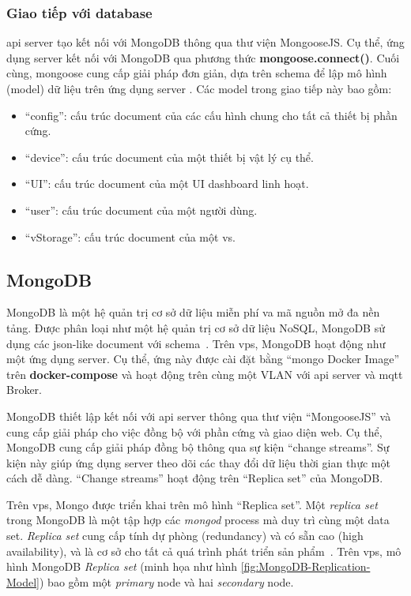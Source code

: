 \subsubsection{Giao tiếp với database}

\acrshort{api} server tạo kết nối với MongoDB thông qua thư viện MongooseJS. Cụ thể, ứng dụng server kết nối với MongoDB qua phương thức \textbf{mongoose.connect()}. Cuối cùng, mongoose cung cấp giải pháp đơn giản, dựa trên schema để lập mô hình (model) dữ liệu trên ứng dụng server \cite{Mongoose-Solution}. Các model trong giao tiếp này bao gồm:

\begin{itemize}
    \item ``config'': cấu trúc document của các cấu hình chung cho tất cả thiết bị phần cứng.
    \item ``device'': cấu trúc document của một thiết bị vật lý cụ thể.
    \item ``UI'': cấu trúc document của một UI dashboard linh hoạt.
    \item ``user'': cấu trúc document của một người dùng.
    \item ``vStorage'': cấu trúc document của một \acrshort{vs}.
\end{itemize}

\subsection{MongoDB}

MongoDB là một hệ quản trị cơ sở dữ liệu miễn phí va mã nguồn mở đa nền tảng. Được phân loại như một hệ quản trị cơ sở dữ liệu NoSQL, MongoDB sử dụng các \acrshort{json}-like document với schema~\cite{MongoDB-Def}. Trên \acrshort{vps}, MongoDB hoạt động như một ứng dụng server. Cụ thể, ứng này được cài đặt bằng ``mongo Docker Image'' trên \textbf{docker-compose} và hoạt động trên cùng một VLAN với \acrshort{api} server và \acrshort{mqtt} Broker.

MongoDB thiết lập kết nối với \acrshort{api} server thông qua thư viện ``MongooseJS'' và cung cấp giải pháp cho việc đồng bộ với phần cứng và giao diện web. Cụ thể, MongoDB cung cấp giải pháp đồng bộ thông qua sự kiện ``change streams''. Sự kiện này giúp ứng dụng server theo dõi các thay đổi dữ liệu thời gian thực một cách dễ dàng. ``Change streams'' hoạt động trên ``Replica set'' của MongoDB.

Trên \acrshort{vps}, Mongo được triển khai trên mô hình ``Replica set''. Một \textit{replica set} trong MongoDB là một tập hợp các \textit{mongod} process mà duy trì cùng một data set. \textit{Replica set} cung cấp tính dự phòng (redundancy) và có sẵn cao (high availability), và là cơ sở cho tất cả quá trình phát triển sản phẩm~\cite{Mongo-Replication-Def}. Trên \acrshort{vps}, mô hình MongoDB \textit{Replica set} (minh họa như hình \ref{fig:MongoDB-Replication-Model}) bao gồm một \textit{primary} node và hai \textit{secondary} node.

